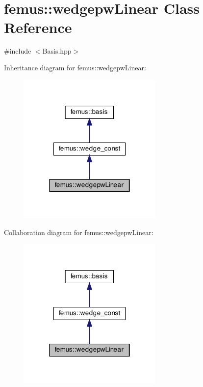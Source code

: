 \hypertarget{classfemus_1_1wedgepw_linear}{}\section{femus\+:\+:wedgepw\+Linear Class Reference}
\label{classfemus_1_1wedgepw_linear}


{\ttfamily \#include $<$Basis.\+hpp$>$}



Inheritance diagram for femus\+:\+:wedgepw\+Linear\+:
\nopagebreak
\begin{figure}[H]
\begin{center}
\leavevmode
\includegraphics[width=202pt]{classfemus_1_1wedgepw_linear__inherit__graph}
\end{center}
\end{figure}


Collaboration diagram for femus\+:\+:wedgepw\+Linear\+:
\nopagebreak
\begin{figure}[H]
\begin{center}
\leavevmode
\includegraphics[width=202pt]{classfemus_1_1wedgepw_linear__coll__graph}
\end{center}
\end{figure}
